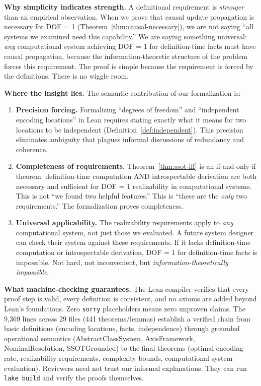 \textbf{Why simplicity indicates strength.} A definitional requirement is \emph{stronger} than an empirical observation. When we prove that causal update propagation is necessary for DOF = 1 (Theorem~\ref{thm:causal-necessary}), we are not saying ``all systems we examined need this capability.'' We are saying something universal: \emph{any} computational system achieving DOF = 1 for definition-time facts must have causal propagation, because the information-theoretic structure of the problem forces this requirement. The proof is simple because the requirement is forced by the definitions. There is no wiggle room.

\textbf{Where the insight lies.} The semantic contribution of our formalization is:

\begin{enumerate}
\item \textbf{Precision forcing.} Formalizing ``degrees of freedom'' and ``independent encoding locations'' in Lean requires stating exactly what it means for two locations to be independent (Definition~\ref{def:independent}). This precision eliminates ambiguity that plagues informal discussions of redundancy and coherence.

\item \textbf{Completeness of requirements.} Theorem~\ref{thm:ssot-iff} is an if-and-only-if theorem: definition-time computation AND introspectable derivation are both necessary and sufficient for DOF = 1 realizability in computational systems. This is not ``we found two helpful features.'' This is ``these are the \emph{only} two requirements.'' The formalization proves completeness.

\item \textbf{Universal applicability.} The realizability requirements apply to \emph{any} computational system, not just those we evaluated. A future system designer can check their system against these requirements. If it lacks definition-time computation or introspectable derivation, DOF = 1 for definition-time facts is impossible. Not hard, not inconvenient, but \emph{information-theoretically impossible}.
\end{enumerate}

\textbf{What machine-checking guarantees.} The Lean compiler verifies that every proof step is valid, every definition is consistent, and no axioms are added beyond Lean's foundations. Zero \texttt{sorry} placeholders means zero unproven claims. The 9,369 lines across 29 files (441 theorems/lemmas) establish a verified chain from basic definitions (encoding locations, facts, independence) through grounded operational semantics (AbstractClassSystem, AxisFramework, NominalResolution, SSOTGrounded) to the final theorems (optimal encoding rate, realizability requirements, complexity bounds, computational system evaluation). Reviewers need not trust our informal explanations. They can run \texttt{lake build} and verify the proofs themselves.

